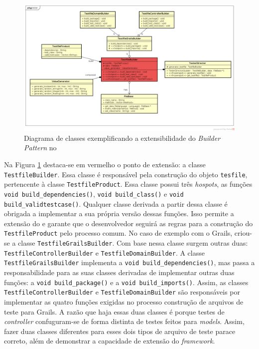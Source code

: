\begin{figure}[h]
  \centering
    \includegraphics[width=\textwidth]{figuras/testfile-grails-class-diagram.png}
    \caption{Diagrama de classes exemplificando a extensibilidade do \textit{Builder Pattern} no \framework}
    \label{testfile-grails-class-diagram}
\end{figure}
\FloatBarrier

Na Figura \ref{testfile-grails-class-diagram} destaca-se em vermelho
o ponto de extensão: a classe \lstinline|TestfileBuilder|. Essa classe é responsável
pela construção do objeto \lstinline|tesfile|, pertencente à classe
\lstinline|TestfileProduct|. Essa classe possui três \textit{hospots}, as funções
\lstinline|void build_dependencies()|, \lstinline|void build_class()| e
\lstinline|void build_validtestcase()|. Qualquer classe derivada a partir dessa classe é
obrigada a implementar a sua própria versão dessas funções. Isso permite a extensão
do \framework e garante que o desenvolvedor seguirá as regras para a construção do
\lstinline|TestfileProduct| pelo processo comum. No caso de exemplo com o
\textsf{Grails}, criou-se a classe \lstinline|TestfileGrailsBuilder|. Com base
nessa classe surgem outras duas: \lstinline|TestfileControllerBuilder| e
\lstinline|TestfileDomainBuilder|. A classe \lstinline|TestfileGrailsBuilder|
implementa a \lstinline|void build_dependencies()|, mas passa a responsabilidade
para as suas classes derivadas de implementar outras duas funções: a
\lstinline|void build_package()| e a \lstinline|void build_imports()|. Assim,
as classes \lstinline|TestfileControllerBuilder| e \lstinline|TestfileDomainBuilder|
são responsáveis por implementar as quatro funções exigidas no processo
construção de arquivos de teste para \textsf{Grails}. A razão que haja essas
duas classes é porque testes de \textit{controller} confuguram-se de forma
distinta de testes feitos para \textit{models}. Assim, fazer duas classes
diferentes para esses dois tipos de arquivo de teste parace correto, além
de demonstrar a capacidade de extensão do \textit{framework}.


